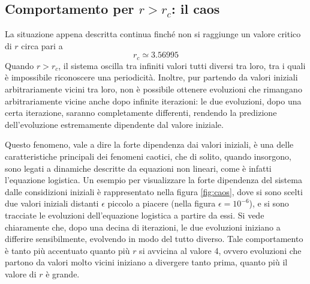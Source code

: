 \subsection{Comportamento per $r > r_c$: il caos}
La situazione appena descritta continua finché non si raggiunge un valore critico di $r$ circa pari a 
\[
    \boxed{r_c \simeq 3.56995}
\]
Quando $r>r_c$, il sistema oscilla tra infiniti valori tutti diversi tra loro, tra i quali è impossibile riconoscere una periodicità. Inoltre, pur partendo da valori iniziali arbitrariamente vicini tra loro, non è possibile ottenere evoluzioni che rimangano arbitrariamente vicine anche dopo infinite iterazioni: le due evoluzioni, dopo una certa iterazione, saranno completamente differenti, rendendo la predizione dell'evoluzione estremamente dipendente dal valore iniziale. 
\begin{minipage}{\linewidth}
\end{minipage}   

\captionsetup{width=.8\linewidth}
\label{fig:caos}
\vspace{20pt}

Questo fenomeno, vale a dire la forte dipendenza dai valori iniziali, è una delle caratteristiche principali dei fenomeni caotici, che di solito, quando insorgono, sono legati a dinamiche descritte da equazioni non lineari, come è infatti l'equazione logistica. Un esempio per visualizzare la forte dipendenza del sistema dalle considizioni iniziali è rappresentato nella figura \ref{fig:caos}, dove si sono scelti due valori iniziali distanti $\epsilon$ piccolo a piacere (nella figura $\epsilon = 10^{-6}$), e si sono tracciate le evoluzioni dell'equazione logistica a partire da essi. Si vede chiaramente che, dopo una decina di iterazioni, le due evoluzioni iniziano a differire sensibilmente, evolvendo in modo del tutto diverso. Tale comportamento è tanto più accentuato quanto più $r$ si avvicina al valore 4, ovvero evoluzioni che partono da valori molto vicini iniziano a divergere tanto prima, quanto più il valore di $r$ è grande.



